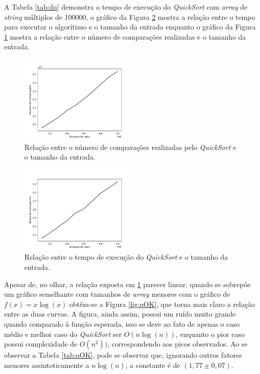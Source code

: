 \documentclass[12pt,a4paper,oneside]{article}
\begin{document}
\quad A Tabela \ref{tab:dq} demonstra o tempo de execução do \textit{QuickSort} com \textit{array} de \textit{string} múltiplos de 100000, o gráfico da Figura \ref{fig:tq} mostra a relação entre o tempo para executar o algorítimo e o tamanho da entrada enquanto o gráfico da Figura \ref{fig:nq} mostra a relação entre o número de comparações realizadas e o tamanho da entrada.

\begin{figure}[H]
\begin{center}
    \includegraphics[width=0.5\textwidth]{FigNQ.png} 
\end{center}
\caption{Relação entre o número de comparações realizadas pelo \textit{QuickSort} e o tamanho da entrada.}
\label{fig:nq}
\end{figure}

\begin{figure}[H]
\begin{center}
    \includegraphics[width=0.5\textwidth]{FigTQ.png} 
\end{center}
\caption{Relação entre o tempo de execução do \textit{QuickSort} e o tamanho da entrada.}
\label{fig:tq}
\end{figure}

\quad Apesar de, no olhar, a relação exposta em \ref{fig:nq} parecer linear, quando se sobrepõe um gráfico semelhante com tamanhos de \textit{array} menores com o gráfico de $f(x)=x\log{(x)}$ obtêm-se a Figura \ref{fig:qOK}, que torna mais claro a relação entre as duas curvas. A figura, ainda assim, possui um ruído muito grande quando comparado à função esperada, isso se deve ao fato de apenas o caso médio e melhor caso do \textit{QuickSort} ser $O(n\log{(n)})$, enquanto o pior caso possui complexidade de $O(n^2))$, correspondendo aos picos observados. Ao se observar a Tabela \ref{tab:qOK}, pode se observar que, ignorando outros fatores menores assintoticamente a $n\log(n)$, a constante é de $(1,77\pm 0,07)$.
\end{document}
